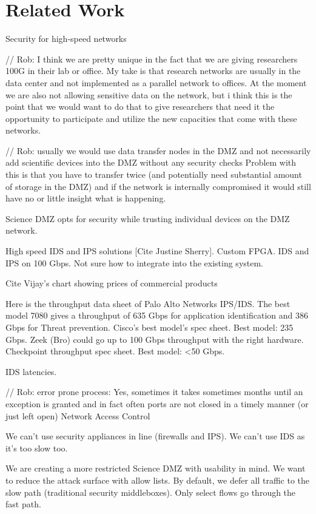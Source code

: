 \section{Related Work}

Security for high-speed networks

// Rob: I think we are pretty unique in the fact that we are giving researchers 100G in their lab or office. My take is that research networks are usually in the data center and not implemented as a parallel network to offices. At the moment we are also not allowing sensitive data on the network, but i think this is the point that we would want to do that to give researchers that need it the opportunity to participate and utilize the new capacities that come with these networks.

// Rob: usually we would use data transfer nodes in the DMZ and not necessarily add scientific devices into the DMZ without any security checks
Problem with this is that you have to transfer twice  (and potentially need substantial amount of storage in the DMZ) and if the network is internally compromised it would still have no or little insight what is happening.


Science DMZ opts for security while trusting individual devices on the DMZ network.

High speed IDS and IPS solutions [Cite Justine Sherry]. Custom FPGA. IDS and IPS on 100 Gbps. Not sure how to integrate into the existing system.

Cite Vijay's chart showing prices of commercial products

Here is the throughput data sheet of Palo Alto Networks IPS/IDS. The best model 7080 gives a throughput of 635 Gbps for application identification and 386 Gbps for Threat prevention.
Cisco's best model's spec sheet. Best model: 235 Gbps.
Zeek (Bro) could go up to 100 Gbps throughput with the right hardware.
Checkpoint throughput spec sheet. Best model: <50 Gbps.

IDS latencies.

// Rob: error prone process: Yes, sometimes it takes sometimes months until an exception is granted and in fact often ports are not closed in a timely manner (or just left open)
Network Access Control

We can't use security appliances in line (firewalls and IPS). We can't use IDS as it's too slow too.

We are creating a more restricted Science DMZ with usability in mind. We want to reduce the attack surface with allow lists. By default, we defer all traffic to the slow path (traditional security middleboxes). Only select flows go through the fast path.

